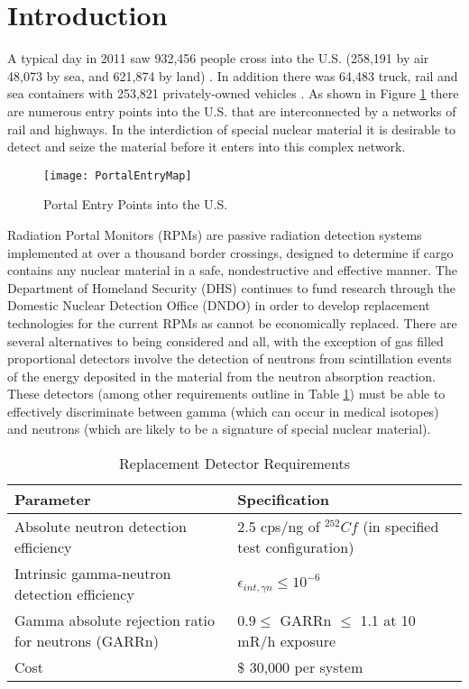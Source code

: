 \section{Introduction}

A typical day in 2011 saw 932,456 people cross into the U.S. (258,191 by air 48,073 by sea, and 621,874 by land) \cite{cpb_typical_2012}.
In addition there was 64,483 truck, rail and sea containers with 253,821 privately-owned vehicles \cite{cpb_typical_2012}.
As shown in Figure \ref{fig:PortalEntryMap} there are numerous entry points into the U.S. that are interconnected by a networks of rail and highways.
In the interdiction of special nuclear material it is desirable to detect and seize the material before it enters into this complex network.
\begin{figure}[h]
    \texttt{[image: PortalEntryMap]}
	\caption{Portal Entry Points into the U.S.}
    \label{fig:PortalEntryMap}
\end{figure}
Radiation Portal Monitors (RPMs) are passive radiation detection systems implemented at over a thousand border crossings, designed to determine if cargo contains any nuclear material in a safe, nondestructive and effective manner\cite{kouzes_neutron_2010}.
The Department of Homeland Security (DHS) continues to fund research through the Domestic Nuclear Detection Office (DNDO) in order to develop replacement technologies for the current  RPMs as  cannot be economically replaced.
There are several alternatives to  being considered and all, with the exception of gas filled proportional detectors involve the detection of neutrons from scintillation events of the energy deposited in the material from the neutron absorption reaction.
These detectors (among other requirements outline in Table \ref{tab:DHSCriteria}) must be able to effectively discriminate between gamma (which can occur in medical isotopes) and neutrons (which are likely to be a signature of special nuclear material).
\begin{table}[h]
    \caption{Replacement Detector Requirements \protect\cite{kouzes_neutron_1999}}
	\centering
	\begin{tabular}{p{} | p{} }
	Parameter & Specification \\
	\hline
	\hline
	Absolute neutron detection efficiency & 2.5 cps/ng of ${}^{252}Cf$ (in specified test configuration) \\
	Intrinsic gamma-neutron detection efficiency & $ \epsilon_{int,\gamma n}\leq 10^{-6}$ \\
	Gamma absolute rejection ratio for neutrons (GARRn) & $ 0.9 \leq \text{ GARRn }\leq$ 1.1 at 10 mR/h exposure \\
	Cost &  \$ 30,000 per system \\
	\hline
	\end{tabular}
    \label{tab:DHSCriteria}
\end{table}

